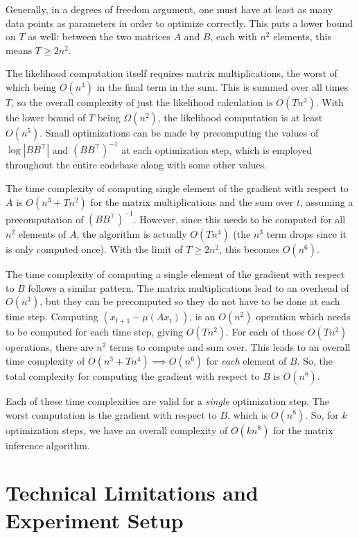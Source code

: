 \documentclass{article}
\theoremstyle{definition}
\begin{document}
Generally, in a degrees of freedom argument, one must have at least as many data points as parameters in order to optimize correctly. This puts a lower bound on $T$ as well: between the two matrices $A$ and $B$, each with $n^2$ elements, this means $T \geq 2n^2$.

The likelihood computation itself requires matrix multiplications, the worst of which being $O(n^3)$ in the final term in the sum. This is summed over all times $T$, so the overall complexity of just the likelihood calculation is $O(Tn^3)$. With the lower bound of $T$ being $\Omega(n^2)$, the likelihood computation is at least $O(n^5)$. Small optimizations can be made by precomputing the values of $\log|BB^\top|$ and $(BB^\top)^{-1}$ at each optimization step, which is employed throughout the entire codebase along with some other values. 

The time complexity of computing single element of the gradient with respect to $A$ is $O(n^3 + Tn^2)$ for the matrix multiplications and the sum over $t$, assuming a precomputation of $(BB^\top)^{-1}$. However, since this needs to be computed for all $n^2$ elements of $A$, the algorithm is actually $O(Tn^4)$ (the $n^3$ term drops since it is only computed once). With the limit of $T \geq 2n^2$, this becomes $O(n^6)$.

The time complexity of computing a single element of the gradient with respect to $B$ follows a similar pattern. The matrix multiplications lead to an overhead of $O(n^3)$, but they can be precomputed so they do not have to be done at each time step. Computing $(x_{t+1} - \mu(Ax_t))$, is an $O(n^2)$ operation which needs to be computed for each time step, giving $O(Tn^2)$. For each of those $O(Tn^2)$ operations, there are $n^2$ terms to compute and sum over. This leads to an overall time complexity of $O(n^3 + Tn^4) \implies O(n^6)$ for \textit{each} element of $B$. So, the total complexity for computing the gradient with respect to $B$ is $O(n^8)$.

Each of these time complexities are valid for a \textit{single} optimization step. The worst computation is the gradient with respect to $B$, which is $O(n^8)$. So, for $k$ optimization steps, we have an overall complexity of $O(kn^8)$ for the matrix inference algorithm.

\section{Technical Limitations and Experiment Setup}
\end{document}
